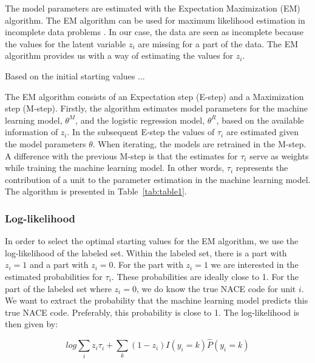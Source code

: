 \documentclass[12pt, a4paper, titlepage]{article}
\begin{document}
The model parameters are estimated with the Expectation Maximization (EM) algorithm. The EM algorithm can be used for maximum likelihood estimation in incomplete data problems \citep{Rubin}. In our case, the data are seen as incomplete because the values for the latent variable $z_i$ are missing for a part of the data. The EM algorithm provides us with a way of estimating the values for $z_i$.


Based on the initial starting values ...

The EM algorithm consists of an Expectation step (E-step) and a Maximization step (M-step). Firstly, the algorithm estimates model parameters for the machine learning model, $\theta^M$, and the logistic regression model, $\theta^R$, based on the available information of $z_i$. In the subsequent E-step the values of $\tau_i$ are estimated given the model parameters $\theta$. When iterating, the models are retrained in the M-step. A difference with the previous M-step is that the estimates for $\tau_i$ serve as weights while training the machine learning model. In other words, $\tau_i$ represents the contribution of a unit to the parameter estimation in the machine learning model. The algorithm is presented in Table~\ref{tab:table1}.




\subsubsection{Log-likelihood}
In order to select the optimal starting values for the EM algorithm, we use the log-likelihood of the labeled set. Within the labeled set, there is a part with $z_i = 1$ and a part with $z_i = 0$. For the part with $z_i = 1$ we are interested in the estimated probabilities for $\tau_i$. These probabilities are ideally close to 1. For the part of the labeled set where $z_i = 0$, we do know the true NACE code for unit $i$. We want to extract the probability that the machine learning model predicts this true NACE code. Preferably, this probability is close to 1.
The log-likelihood is then given by:

						\begin{equation}\label{log}
log \sum_i z_i \tau_i + \sum_k (1-z_i)I(y_i = k)\hat{P}(y_i=k)
						\end{equation}
\end{document}
